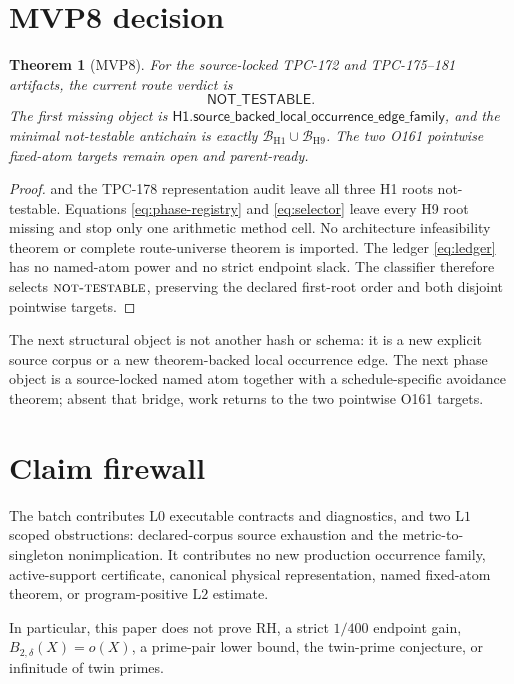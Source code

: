 \documentclass[11pt]{article}
\newtheorem{theorem}{Theorem}[section]
\theoremstyle{definition}
\theoremstyle{remark}
\newcommand{\NT}{\textnormal{\textsc{not-testable}}}
\newcommand{\Lzero}{\mathrm{L0}}
\newcommand{\Lone}{\mathrm{L1}}
\newcommand{\Ltwo}{\mathrm{L2}}
\begin{document}
\section{MVP8 decision}

\begin{theorem}[MVP8]\label{thm:mvp8}
For the source-locked TPC-172 and TPC-175--181 artifacts, the current
route verdict is
\[
\boxed{\mathsf{NOT\_TESTABLE}}.
\tag{14}\label{eq:mvp8}
\]
The first missing object is
\(\mathsf{H1.source\_backed\_local\_occurrence\_edge\_family}\), and
the minimal not-testable antichain is exactly
\(\mathcal B_{\mathrm{H1}}\cup\mathcal B_{\mathrm{H9}}\).
The two O161 pointwise fixed-atom targets remain open and
parent-ready.
\end{theorem}

\begin{proof}
 and the TPC-178 representation audit
leave all three H1 roots not-testable.  Equations
\eqref{eq:phase-registry} and \eqref{eq:selector} leave every H9 root
missing and stop only one arithmetic method cell.  No architecture
infeasibility theorem or complete route-universe theorem is imported.
The ledger \eqref{eq:ledger} has no named-atom power and no strict
endpoint slack.  The classifier therefore selects \(\NT\), preserving
the declared first-root order and both disjoint pointwise targets.
\end{proof}

The next structural object is not another hash or schema: it is a new
explicit source corpus or a new theorem-backed local occurrence edge.
The next phase object is a source-locked named atom together with a
schedule-specific avoidance theorem; absent that bridge, work returns
to the two pointwise O161 targets.

\section{Claim firewall}

The batch contributes \(\Lzero\) executable contracts and diagnostics,
and two \(\Lone\) scoped obstructions: declared-corpus source
exhaustion and the metric-to-singleton nonimplication.  It contributes
no new production occurrence family, active-support certificate,
canonical physical representation, named fixed-atom theorem, or
program-positive \(\Ltwo\) estimate.

In particular, this paper does not prove RH, a strict \(1/400\)
endpoint gain, \(B_{2,\delta}(X)=o(X)\), a prime-pair lower bound, the
twin-prime conjecture, or infinitude of twin primes.



\end{document}
